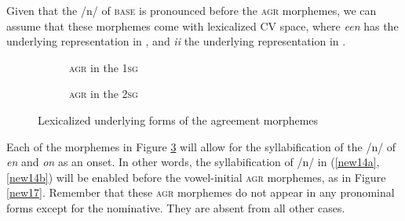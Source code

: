 \documentclass[output=paper]{langscibook}
\begin{document}
Given that the /n/ of \textsc{base} is pronounced before the \textsc{agr} morphemes, we can assume that these morphemes come with lexicalized CV space, where \textit{een} has the underlying representation in , and \emph{ii} the underlying representation in .

\begin{figure}
    \centering
    \begin{subfigure}{.4\textwidth}
        \centering 
        \caption{\textsc{agr} in the 1\textsc{sg}}
        \label{new16a}
    \end{subfigure}
    \begin{subfigure}{.4\textwidth}
        \centering 
        \caption{\textsc{agr} in the 2\textsc{sg}}
        \label{new16b}
    \end{subfigure}
    \caption{Lexicalized underlying forms of the agreement morphemes}
    \label{new16}
\end{figure}

Each of the morphemes in Figure \ref{new16} will allow for the syllabification of the /n/ of \textit{en} and \textit{on} as an onset. In other words, the syllabification of /n/ in (\ref{new14a}, \ref{new14b}) will be enabled before the vowel-initial \textsc{agr} morphemes, as in Figure \ref{new17}. Remember that these \textsc{agr} morphemes do not appear in any pronominal forms except for the nominative. They are absent from all other cases. 
\end{document}
